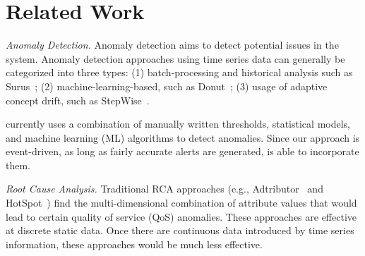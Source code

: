 \section{Related Work}
\label{sec:related}


\emph{Anomaly Detection.} Anomaly detection aims to detect potential issues in the system. Anomaly detection approaches using time series data can generally be categorized into three types: (1) batch-processing and historical analysis such as  Surus~\cite{nflxsurus}; (2) machine-learning-based, such as Donut~\cite{xu2018unsupervised}; (3) usage of adaptive concept drift, such as StepWise~\cite{ma2018robust}.


\system currently uses a combination of manually written thresholds, statistical models, and machine learning (ML) algorithms to detect  anomalies. Since our approach is event-driven, as long as fairly accurate alerts are generated, \system is able to incorporate them. 


\emph{Root Cause Analysis.} Traditional RCA approaches (e.g., Adtributor~\cite{bhagwan2014adtributor} and HotSpot~\cite{sun2018hotspot}) find the multi-dimensional combination of attribute values that would lead to certain quality of service (QoS) anomalies. These approaches are effective at discrete static data. Once there are continuous data introduced by time series information, these approaches would be much less effective.

